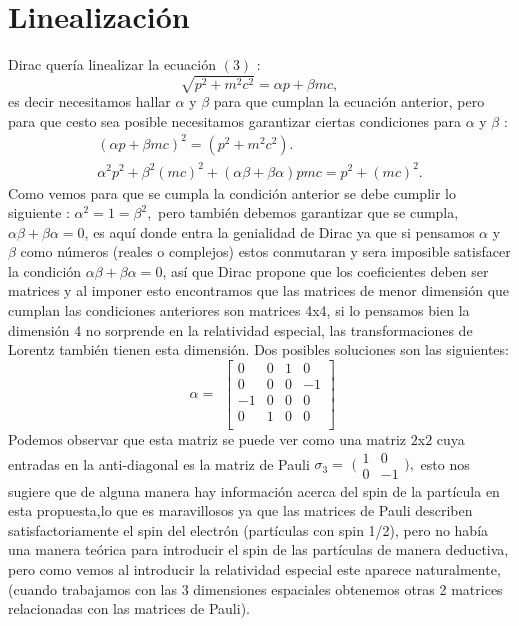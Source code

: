\documentclass[twocolumn]{article}
\begin{document}
\section{Linealización}
Dirac quería linealizar la ecuación $(3)$ :
\begin{equation}
    \sqrt{p^2 + m^2c^2}=\alpha p+\beta mc ,
\end{equation}
 es decir necesitamos hallar $\alpha$ y $\beta$ para que cumplan la ecuación anterior, pero para que cesto sea posible necesitamos garantizar ciertas condiciones para  $\alpha$ y $\beta$ :
\begin{gather}
    (\alpha p+\beta mc)^2 = (p^2 + m^2 c^2) . \\
    \alpha^2 p^2 + \beta ^2 (mc)^2 +(\alpha \beta +\beta \alpha)pmc = p^2 + (mc)^2 .
\end{gather}
Como vemos para que se cumpla la condición anterior se debe cumplir lo siguiente : $\alpha^2 = 1 = \beta^2 ,$ pero también debemos garantizar que se cumpla, $\alpha\beta +\beta \alpha=0$, es aquí donde entra la genialidad de Dirac ya que si pensamos $\alpha$ y $\beta$ como números (reales o complejos) estos conmutaran y sera imposible satisfacer la condición $\alpha \beta+\beta\alpha=0$, así que Dirac propone que los coeficientes deben ser matrices y al imponer esto encontramos que las matrices de menor dimensión que cumplan las condiciones anteriores son matrices 4x4, si lo pensamos bien la dimensión 4 no sorprende en la relatividad especial, las transformaciones de Lorentz también tienen esta dimensión.
Dos posibles soluciones son las siguientes:
\begin{equation}
\begin{matrix}
\alpha=
\end{matrix}
\begin{bmatrix}
0 & 0 & 1 & 0 \\
0 & 0 & 0 & -1 \\
-1 & 0 & 0 & 0 \\
0 & 1 & 0 & 0 \\
\end{bmatrix}
\end{equation}
Podemos observar que esta matriz se puede ver como una matriz $2$x$2$ cuya entradas en la anti-diagonal es la matriz de Pauli $\sigma_3=$ $\big(\begin{smallmatrix}
  1 & 0\\
  0 & -1
\end{smallmatrix}\big),$
 esto nos sugiere que de alguna manera hay información acerca del spin de la partícula en esta propuesta,lo que es maravillosos ya que las matrices de Pauli describen satisfactoriamente el spin del electrón (partículas con spin 1/2), pero no había una manera teórica para introducir el spin de las partículas de manera deductiva, pero como vemos al introducir la relatividad especial este aparece naturalmente, (cuando trabajamos con las 3 dimensiones espaciales obtenemos otras 2 matrices relacionadas con las matrices de Pauli).
\end{document}
